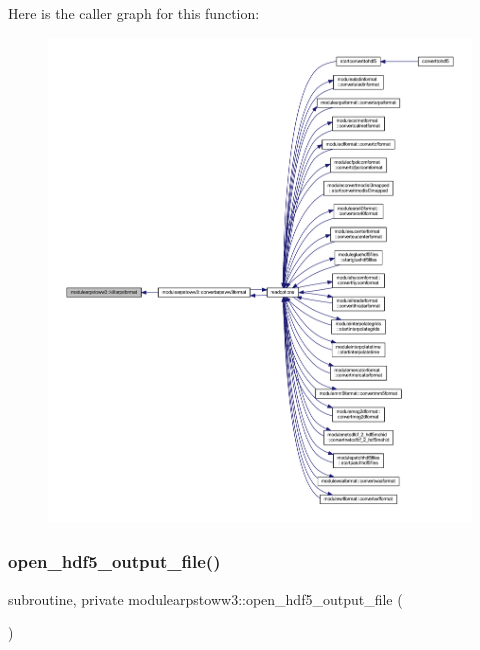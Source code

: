 Here is the caller graph for this function\+:\nopagebreak
\begin{figure}[H]
\begin{center}
\leavevmode
\includegraphics[width=350pt]{namespacemodulearpstoww3_a2b22a4f72b20cf6f219d61b511afcad1_icgraph}
\end{center}
\end{figure}
\mbox{\label{namespacemodulearpstoww3_a7a7eb9b823582e046e2127ea46d3f300}} 
\subsubsection{\texorpdfstring{open\+\_\+hdf5\+\_\+output\+\_\+file()}{open\_hdf5\_output\_file()}}
{\footnotesize\ttfamily subroutine, private modulearpstoww3\+::open\+\_\+hdf5\+\_\+output\+\_\+file (\begin{DoxyParamCaption}{ }\end{DoxyParamCaption})\hspace{0.3cm}{\ttfamily [private]}}

